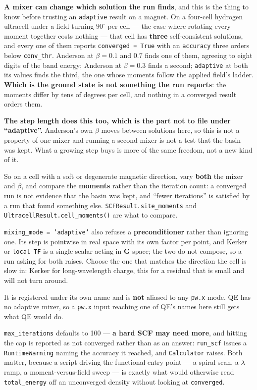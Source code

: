 \documentclass[11pt,a4paper]{article}
\newcommand{\code}[1]{\texttt{\small #1}}
\begin{document}
\begin{refuses}
\textbf{A mixer can change which solution the run finds}, and this is the thing
to know before trusting an \code{adaptive} result on a magnet. On a four-cell
hydrogen ultracell under a field turning $90^\circ$ per cell --- the case where
rotating every moment together costs nothing --- that cell has \textbf{three}
self-consistent solutions, and every one of them reports
\code{converged = True} with an \code{accuracy} three orders below
\code{conv\_thr}. Anderson at $\beta = 0.1$ and $0.7$ finds one of them, agreeing
to eight digits of the band energy; Anderson at $\beta = 0.3$ finds a second;
\code{adaptive} at both its values finds the third, the one whose moments follow
the applied field's ladder. \textbf{Which is the ground state is not something
the run reports}: the moments differ by tens of degrees per cell, and nothing in
a converged result orders them.

\textbf{The step length does this too, which is the part not to file under
``adaptive''.} Anderson's own $\beta$ moves between solutions here, so this is
not a property of one mixer and running a second mixer is not a test that the
basin was kept. What a growing step buys is more of the same freedom, not a new
kind of it.

So on a cell with a soft or degenerate magnetic direction, vary
\textbf{both} the mixer and $\beta$, and compare the \textbf{moments} rather
than the iteration count: a converged run is not evidence that the basin was
kept, and ``fewer iterations'' is satisfied by a run that found something else.
\code{SCFResult.site\_moments} and \code{UltracellResult.cell\_moments()} are
what to compare.

\code{mixing\_mode = 'adaptive'} also refuses a \textbf{preconditioner} rather
than ignoring one. Its step is pointwise in real space with its own factor per point,
and Kerker or \code{local-TF} is a single scalar acting in $\mathbf G$-space; the
two do not compose, so a run asking for both raises. Choose the one that matches
the direction the cell is slow in: Kerker for long-wavelength charge, this for a
residual that is small and will not turn around.

It is registered under its own name and is \textbf{not} aliased to any
\code{pw.x} mode. QE has no adaptive mixer, so a \code{pw.x} input reaching one
of QE's names here still gets what QE would do.
\end{refuses}

\code{max\_iterations}
defaults to 100 --- \textbf{a hard SCF may need more}, and hitting the cap is
reported as not converged rather than as an answer: \code{run\_scf} issues a
\code{RuntimeWarning} naming the accuracy it reached, and \code{Calculator}
raises. Both matter, because a script driving the functional entry point --- a
spiral scan, a $\lambda$ ramp, a moment-versus-field sweep --- is exactly what
would otherwise read \code{total\_energy} off an unconverged density without
looking at \code{converged}.
\end{document}
